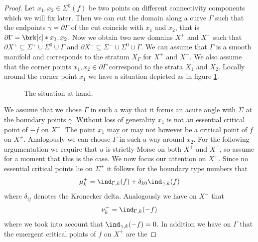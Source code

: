 \begin{proof}
  Let $x_1,x_2\in\Sigma^0(f)$ be two points on different connectivity components which we will fix later.
  Then we can cut the domain along a curve $\Gamma$ such that the endpoints $\gamma=\partial\Gamma$
  of the cut coincide with $x_1$ and $x_2$, that is $\partial\Gamma=\brk[c]*{x_1,x_2}$.
  Now we obtain two new domains $X^+$ and $X^-$ such that $\partial X^+ \subseteq\Sigma^+\cup\Sigma^0\cup\Gamma$ and
  $\partial X^-\subseteq\Sigma^-\cup\Sigma^0\cup\Gamma$. We can assume that $\Gamma$ is a smooth manifold and corresponds to the stratum 
  $X_\Gamma$ for $X^+$ and $X^-$. We also assume that the corner points $x_1,x_2\in\partial\Gamma$ correspond to the strata $X_{1}$ and $X_{2}$.
  Locally around the corner point $x_1$ we have a situation depicted as in figure \ref{fi:n2_cutOmega_flowthrough}.
  \begin{figure}
    \centering
    
    \caption{The situation at hand.}
    \label{fi:n2_cutOmega_flowthrough}
  \end{figure}
  We assume that we chose $\Gamma$ in such a way that it forms an acute angle with $\Sigma$ at the boundary points $\gamma$.
  Without loss of generality $x_1$ is not an essential critical point of $-f$ on $X^-$.
  The point $x_1$ may or may not however be a critical point of $f$ on $X^+$.
  Analogously we can choose $\Gamma$ in such a way around $x_2$.
  For the following argumentation we require that $u$ is strictly Morse on both $X^+$ and $X^-$, so assume for a moment that this
  is the case.
  We now focus our attention on $X^+$. Since no essential critical points lie on $\Sigma^+$
  it follows for the boundary type numbers that
  \begin{align}
    \mu^+_k=\ind_{\Gamma,k}(f)+\delta_{k0}\ind_{\gamma,k}(f)\label{eq:n2_disproof_morse_muplus}
  \end{align}
  where $\delta_{ij}$ denotes the Kronecker delta.
  Analogously we have on $X^-$ that
  \begin{align}
    \nu^-_k=\ind_{\Gamma,k}(-f)\label{eq:n2_disproof_morse_numinus}
  \end{align}
  where we took into account that $\ind_{\gamma,k}(-f)=0$.
  In addition we have on $\Gamma$ that the emergent critical points of $f$ on $X^+$ are the

\end{proof}
